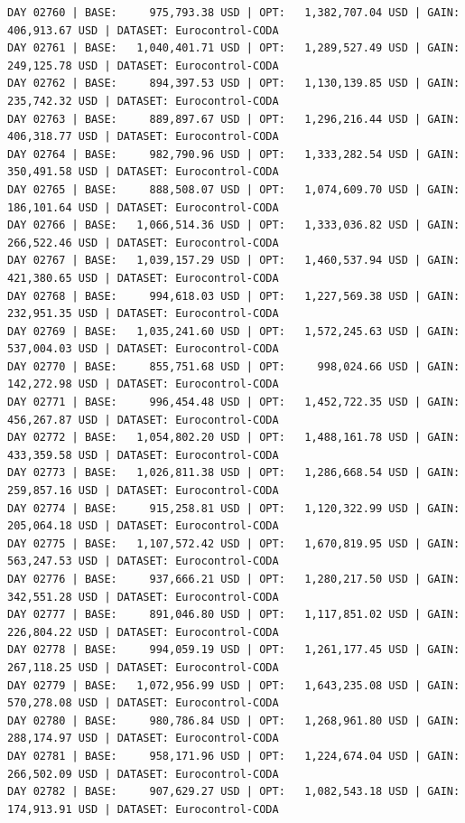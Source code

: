 \documentclass[11pt,a4paper]{article}
\begin{document}
\begin{verbatim}
DAY 02760 | BASE:     975,793.38 USD | OPT:   1,382,707.04 USD | GAIN: 406,913.67 USD | DATASET: Eurocontrol-CODA
DAY 02761 | BASE:   1,040,401.71 USD | OPT:   1,289,527.49 USD | GAIN: 249,125.78 USD | DATASET: Eurocontrol-CODA
DAY 02762 | BASE:     894,397.53 USD | OPT:   1,130,139.85 USD | GAIN: 235,742.32 USD | DATASET: Eurocontrol-CODA
DAY 02763 | BASE:     889,897.67 USD | OPT:   1,296,216.44 USD | GAIN: 406,318.77 USD | DATASET: Eurocontrol-CODA
DAY 02764 | BASE:     982,790.96 USD | OPT:   1,333,282.54 USD | GAIN: 350,491.58 USD | DATASET: Eurocontrol-CODA
DAY 02765 | BASE:     888,508.07 USD | OPT:   1,074,609.70 USD | GAIN: 186,101.64 USD | DATASET: Eurocontrol-CODA
DAY 02766 | BASE:   1,066,514.36 USD | OPT:   1,333,036.82 USD | GAIN: 266,522.46 USD | DATASET: Eurocontrol-CODA
DAY 02767 | BASE:   1,039,157.29 USD | OPT:   1,460,537.94 USD | GAIN: 421,380.65 USD | DATASET: Eurocontrol-CODA
DAY 02768 | BASE:     994,618.03 USD | OPT:   1,227,569.38 USD | GAIN: 232,951.35 USD | DATASET: Eurocontrol-CODA
DAY 02769 | BASE:   1,035,241.60 USD | OPT:   1,572,245.63 USD | GAIN: 537,004.03 USD | DATASET: Eurocontrol-CODA
DAY 02770 | BASE:     855,751.68 USD | OPT:     998,024.66 USD | GAIN: 142,272.98 USD | DATASET: Eurocontrol-CODA
DAY 02771 | BASE:     996,454.48 USD | OPT:   1,452,722.35 USD | GAIN: 456,267.87 USD | DATASET: Eurocontrol-CODA
DAY 02772 | BASE:   1,054,802.20 USD | OPT:   1,488,161.78 USD | GAIN: 433,359.58 USD | DATASET: Eurocontrol-CODA
DAY 02773 | BASE:   1,026,811.38 USD | OPT:   1,286,668.54 USD | GAIN: 259,857.16 USD | DATASET: Eurocontrol-CODA
DAY 02774 | BASE:     915,258.81 USD | OPT:   1,120,322.99 USD | GAIN: 205,064.18 USD | DATASET: Eurocontrol-CODA
DAY 02775 | BASE:   1,107,572.42 USD | OPT:   1,670,819.95 USD | GAIN: 563,247.53 USD | DATASET: Eurocontrol-CODA
DAY 02776 | BASE:     937,666.21 USD | OPT:   1,280,217.50 USD | GAIN: 342,551.28 USD | DATASET: Eurocontrol-CODA
DAY 02777 | BASE:     891,046.80 USD | OPT:   1,117,851.02 USD | GAIN: 226,804.22 USD | DATASET: Eurocontrol-CODA
DAY 02778 | BASE:     994,059.19 USD | OPT:   1,261,177.45 USD | GAIN: 267,118.25 USD | DATASET: Eurocontrol-CODA
DAY 02779 | BASE:   1,072,956.99 USD | OPT:   1,643,235.08 USD | GAIN: 570,278.08 USD | DATASET: Eurocontrol-CODA
DAY 02780 | BASE:     980,786.84 USD | OPT:   1,268,961.80 USD | GAIN: 288,174.97 USD | DATASET: Eurocontrol-CODA
DAY 02781 | BASE:     958,171.96 USD | OPT:   1,224,674.04 USD | GAIN: 266,502.09 USD | DATASET: Eurocontrol-CODA
DAY 02782 | BASE:     907,629.27 USD | OPT:   1,082,543.18 USD | GAIN: 174,913.91 USD | DATASET: Eurocontrol-CODA

\end{verbatim}
\end{document}
